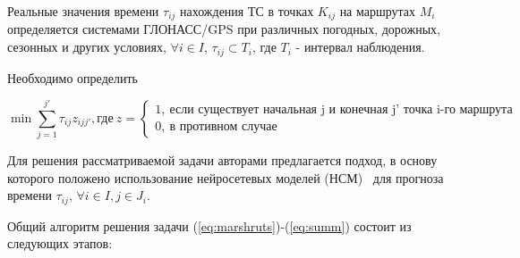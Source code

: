 \documentclass[a4paper,13pt]{article}
\begin{document}
Реальные значения времени \begin{math}\tau_{ij}\end{math} нахождения ТС в точках \begin{math}K_{ij}\end{math} на маршрутах \begin{math}M_i\end{math} определяется системами ГЛОНАСС/GPS при различных погодных, дорожных, сезонных и других условиях, \begin{math}\forall i \in I\end{math}, \begin{math}\tau_{ij} \subset T_i\end{math}, где \begin{math}T_i\end{math} - интервал наблюдения.

Необходимо определить

\begin{equation}\label{eq:summ}
\min \sum_{j=1}^{j'}{\tau_{ij}z_{ijj'}}, \text{где}\ z =
\begin{cases}
1,\ \text{если существует начальная j и конечная j' точка i-го маршрута}\\
0,\ \text{в противном случае}
\end{cases}
\end{equation}

Для решения рассматриваемой задачи авторами предлагается подход, в основу которого положено использование нейросетевых моделей (НСМ)~\cite{neiro} для прогноза времени \begin{math}\tau_{ij}\end{math}, \begin{math}\forall i \in I, j \in J_i \end{math}.

Общий алгоритм решения задачи (\ref{eq:marshruts})-(\ref{eq:summ}) состоит из следующих этапов:
\end{document}
